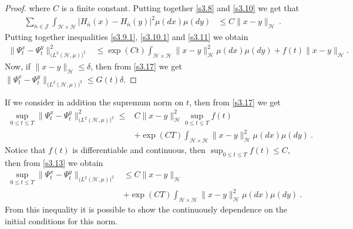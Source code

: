 \documentclass[review,onefignum,onetabnum]{siamart190516}
\begin{document}
\begin{proof}
        where $C$ is a finite constant. Putting together \eqref{s3.8} and
        \eqref{s3.10} we get that
        \begin{align}
            \sum_{\bar n\in \mathcal{J}} \int_{\mathcal{H}\times \mathcal{H}}  
            \big|
            H_{\bar n}(x) -H_{\bar n}(y) \big|^2 \mu(dx)\mu(dy) &\le
            C \| x-y\|_{\mathcal{H}} \ .
            \label{s3.11}
        \end{align}
        Putting together inequalities \eqref{s3.9.1}, \eqref{s3.10.1} and
        \eqref{s3.11} we obtain
        \begin{align}
          \| \Psi_t^x-\Psi_t^y\|_{\big(L^2(\mathcal{H},\mu) \big)^2}^2&\le   
          \exp(Ct)
          \int_{\mathcal{H}\times \mathcal{H}}
          \| x-y\|_{\mathcal{H}}^2 \mu(dx)\mu(dy) +  f(t)\| x-y\|_{\mathcal{H}}.
          \label{s3.17}
        \end{align}
        Now, if $\| x-y\|_{\mathcal{H}}\le \delta $, then from \eqref{s3.17} we 
        get
        $
             \| 
                \Psi_t^x - \Psi_t^y
             \|_{\big( L^2(\mathcal{H}, \mu) \big)^2} 
             \le
                G(t) \delta
        $.
    \end{proof}
%
    \begin{remark}
        If we consider in addition the supremum norm on $t$, then from
        \eqref{s3.17} we get
        \begin{equation}
            \label{s3.13}
            \begin{aligned}
                \sup_{0\le t\le T}\| \Psi_t^x-\Psi_t^y\|_{
                    \big(L^2(\mathcal{H},\mu) \big)^2} ^ 2
                    \le&
                     C \| x-y\|_{\mathcal{H}}^2
                     \sup_{0\le t\le T} f(t)
                     \\
                     &+
                    \exp(CT)
                    \int_{\mathcal{H}\times \mathcal{H}}
                    \|x-y\|_{\mathcal{H}}^2 \mu(dx)\mu(dy) \ .
            \end{aligned}
        \end{equation}
        Notice that $f(t)$ is differentiable and continuous, then
        $\sup_{0\le t\le T} f(t)\le C$, then from \eqref{s3.13} we obtain
        \begin{equation}
            \label{s3.14}
            \begin{aligned}
                \sup_{0\le t\le T}
                \|
                    \Psi_t^x-\Psi_t^y
                \|_{\big(L^2(\mathcal{H},\mu)\big)^2}
                &\le
                C \| x-y\|_{\mathcal{H}}
                \\
                & +
                \exp(CT)
                \int_{\mathcal{H}\times \mathcal{H}}
                \| x-y\|_{\mathcal{H}}^2 \mu(dx)\mu(dy) \ .
            \end{aligned}
        \end{equation}
        From this inequality it is possible to show the continuously dependence 
        on the initial conditions for this norm.
    \end{remark}
\end{document}

